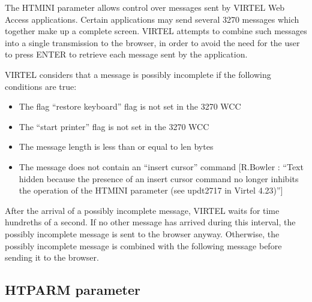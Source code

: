 \documentclass[letterpaper,10pt,english]{sphinxmanual}
\begin{document}
\sphinxAtStartPar
The HTMINI parameter allows control over messages sent by VIRTEL Web Access applications. Certain applications may send several 3270 messages which together make up a complete screen. VIRTEL attempts to combine such messages into a single transmission to the browser, in order to avoid the need for the user to press ENTER to retrieve each message sent by the application.

\sphinxAtStartPar
VIRTEL considers that a message is possibly incomplete if the following conditions are true:
\begin{itemize}
\item {} 
\sphinxAtStartPar
The flag “restore keyboard” flag is not set in the 3270 WCC

\item {} 
\sphinxAtStartPar
The “start printer” flag is not set in the 3270 WCC

\item {} 
\sphinxAtStartPar
The message length is less than or equal to len bytes

\item {} 
\sphinxAtStartPar
The message does not contain an “insert cursor” command {[}R.Bowler : “Text hidden because the presence of an insert cursor command no longer inhibits the operation of the HTMINI parameter (see updt2717 in Virtel 4.23)”{]}

\end{itemize}

\sphinxAtStartPar
After the arrival of a possibly incomplete message, VIRTEL waits for time hundreths of a second. If no other message has arrived during this interval, the possibly incomplete message is sent to the browser anyway. Otherwise, the possibly incomplete message is combined with the following message before sending it to the browser.

\ignorespaces 

\subsection{HTPARM parameter}
\label{\detokenize{Installation_Guide:htparm-parameter}}\label{\detokenize{Installation_Guide:index-79}}
\begin{sphinxVerbatim}[commandchars=\\\{\}]
                 
\end{sphinxVerbatim}
\end{document}
